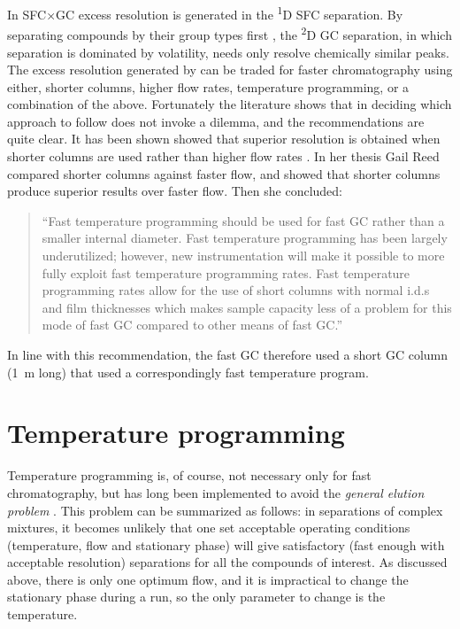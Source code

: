 In SFC×GC excess resolution is generated in the \textsuperscript{1}D SFC
separation. By separating compounds by their group types first
\autocite{Venter2006}, the \textsuperscript{2}D GC separation, in which
separation is dominated by volatility, needs only resolve chemically similar
peaks. The excess resolution generated by can be traded for faster
chromatography using either, shorter columns, higher flow rates, temperature
programming, or a combination of the above. Fortunately the literature shows
that in deciding which approach to follow does not invoke a dilemma, and the
recommendations are quite clear. It has been shown showed that superior
resolution is obtained when shorter columns are used rather than higher flow
rates \autocite{Klee2002}. In her thesis Gail Reed \autocite{Reed1999} compared
shorter columns against faster flow, and showed that shorter columns produce
superior results over faster flow.
Then she concluded:
\begin{quotation}
``Fast temperature programming should be used for fast
GC rather than a smaller internal diameter. Fast temperature programming has been
largely underutilized; however, new instrumentation will make it possible to more fully
exploit fast temperature programming rates. Fast temperature programming rates allow
for the use of short columns with normal i.d.s and film thicknesses which makes sample
capacity less of a problem for this mode of fast GC compared to other means of fast GC.''
\end{quotation}

In line with this recommendation, the fast GC therefore used a short GC column
(\SI{1}{\metre} long) that used a correspondingly fast temperature program.

\section{Temperature programming}

Temperature programming is, of course, not necessary only for fast
chromatography, but has long been implemented to avoid the \textit{general
elution problem} \autocite{Skoog2007}. This problem can be summarized as
follows: in separations of complex mixtures, it becomes unlikely that one set
acceptable operating conditions (temperature, flow and stationary phase) will
give satisfactory (fast enough with acceptable resolution) separations for all
the compounds of interest. As discussed above, there is only one optimum flow,
and it is impractical to change the stationary phase during a run, so the only
parameter to change is the temperature.

